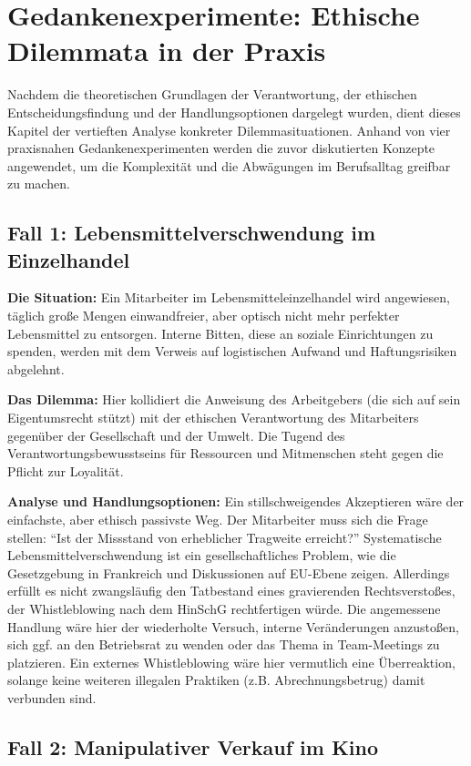 \documentclass[
    12pt,               %
    a4paper,            %
    ngerman             %
]{scrartcl}
\begin{document}
\section{Gedankenexperimente: Ethische Dilemmata in der Praxis}

Nachdem die theoretischen Grundlagen der Verantwortung, der ethischen Entscheidungsfindung und der Handlungsoptionen dargelegt wurden, dient dieses Kapitel der vertieften Analyse konkreter Dilemmasituationen. Anhand von vier praxisnahen Gedankenexperimenten werden die zuvor diskutierten Konzepte angewendet, um die Komplexität und die Abwägungen im Berufsalltag greifbar zu machen.

\subsection{Fall 1: Lebensmittelverschwendung im Einzelhandel}

\textbf{Die Situation:} Ein Mitarbeiter im Lebensmitteleinzelhandel wird angewiesen, täglich große Mengen einwandfreier, aber optisch nicht mehr perfekter Lebensmittel zu entsorgen. Interne Bitten, diese an soziale Einrichtungen zu spenden, werden mit dem Verweis auf logistischen Aufwand und Haftungsrisiken abgelehnt.

\textbf{Das Dilemma:} Hier kollidiert die Anweisung des Arbeitgebers (die sich auf sein Eigentumsrecht stützt) mit der ethischen Verantwortung des Mitarbeiters gegenüber der Gesellschaft und der Umwelt. Die Tugend des Verantwortungsbewusstseins für Ressourcen und Mitmenschen steht gegen die Pflicht zur Loyalität.

\textbf{Analyse und Handlungsoptionen:} Ein stillschweigendes Akzeptieren wäre der einfachste, aber ethisch passivste Weg. Der Mitarbeiter muss sich die Frage stellen: \enquote{Ist der Missstand von erheblicher Tragweite erreicht?} Systematische Lebensmittelverschwendung ist ein gesellschaftliches Problem, wie die Gesetzgebung in Frankreich und Diskussionen auf EU-Ebene zeigen. Allerdings erfüllt es nicht zwangsläufig den Tatbestand eines gravierenden Rechtsverstoßes, der Whistleblowing nach dem HinSchG rechtfertigen würde. Die angemessene Handlung wäre hier der wiederholte Versuch, interne Veränderungen anzustoßen, sich ggf. an den Betriebsrat zu wenden oder das Thema in Team-Meetings zu platzieren. Ein externes Whistleblowing wäre hier vermutlich eine Überreaktion, solange keine weiteren illegalen Praktiken (z.B. Abrechnungsbetrug) damit verbunden sind.

\subsection{Fall 2: Manipulativer Verkauf im Kino}
\end{document}
